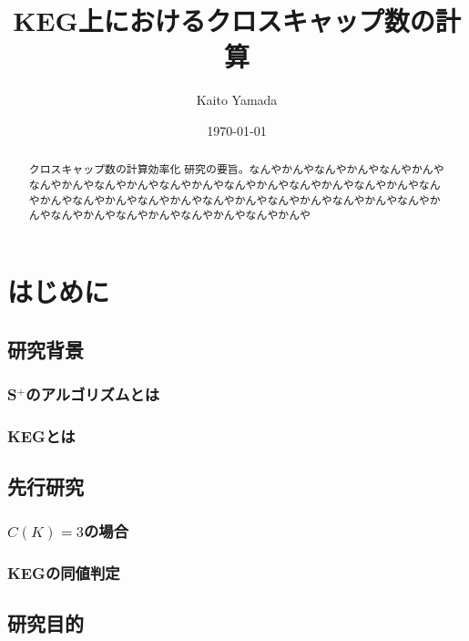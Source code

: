 \documentclass[11pt,a4j]{jarticle}
\title{KEG上におけるクロスキャップ数の計算}
\author{Kaito Yamada}
\date{\today}
\newcommand{\splus}{S${}^\text{+}$}
\begin{document}
\maketitle
\vspace{30mm}
\begin{abstract}
    クロスキャップ数の計算効率化
    研究の要旨。なんやかんやなんやかんやなんやかんやなんやかんやなんやかんやなんやかんやなんやかんやなんやかんやなんやかんやなんやかんやなんやかんやなんやかんやなんやかんやなんやかんやなんやかんやなんやかんやなんやかんやなんやかんやなんやかんやなんやかんや
\end{abstract}

\clearpage

\tableofcontents

\pagestyle{plain}
\lhead{\rightmark}

\section{はじめに} %

\subsection{研究背景}
\subsubsection{\splus のアルゴリズムとは}
\subsubsection{KEGとは}


\subsection{先行研究}
\subsubsection{$C(K)=3$の場合}
\subsubsection{KEGの同値判定}

\subsection{研究目的}
\end{document}

